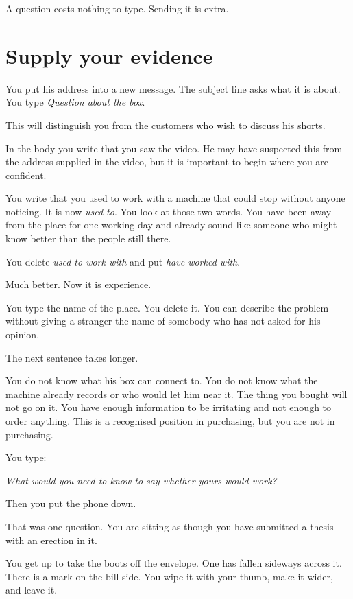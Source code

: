 \documentclass[11pt,oneside]{book}
\begin{document}
A question costs nothing to type. Sending it is extra.

\section*{Supply your evidence}

You put his address into a new message. The subject line asks what it is about. You type \emph{Question about the box}.

This will distinguish you from the customers who wish to discuss his shorts.

In the body you write that you saw the video. He may have suspected this from the address supplied in the video, but it is important to begin where you are confident.

You write that you used to work with a machine that could stop without anyone noticing. It is now \emph{used to}. You look at those two words. You have been away from the place for one working day and already sound like someone who might know better than the people still there.

You delete \emph{used to work with} and put \emph{have worked with}.

Much better. Now it is experience.

You type the name of the place. You delete it. You can describe the problem without giving a stranger the name of somebody who has not asked for his opinion.

The next sentence takes longer.

You do not know what his box can connect to. You do not know what the machine already records or who would let him near it. The thing you bought will not go on it. You have enough information to be irritating and not enough to order anything. This is a recognised position in purchasing, but you are not in purchasing.

You type:

\emph{What would you need to know to say whether yours would work?}

Then you put the phone down.

That was one question. You are sitting as though you have submitted a thesis with an erection in it.

You get up to take the boots off the envelope. One has fallen sideways across it. There is a mark on the bill side. You wipe it with your thumb, make it wider, and leave it.
\end{document}
